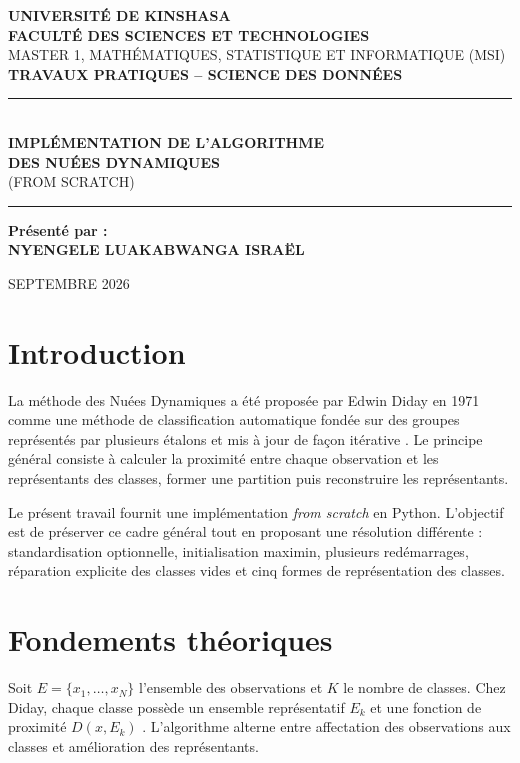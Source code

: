 \documentclass[12pt,a4paper]{article}
\begin{document}
\begin{titlepage}
\centering
{\large\textbf{UNIVERSITÉ DE KINSHASA}}\\[0.3cm]
{\large\textbf{FACULTÉ DES SCIENCES ET TECHNOLOGIES}}\\[0.3cm]
{\normalsize MASTER 1, MATHÉMATIQUES, STATISTIQUE ET INFORMATIQUE (MSI)}\\[2cm]
{\Large\textbf{TRAVAUX PRATIQUES -- SCIENCE DES DONNÉES}}\\[1.5cm]
\rule{\textwidth}{0.5pt}\\[0.5cm]
{\Huge\bfseries IMPLÉMENTATION DE L'ALGORITHME\\[0.3cm] DES NUÉES DYNAMIQUES}\\[0.3cm]
{\large (FROM SCRATCH)}\\[0.5cm]
\rule{\textwidth}{0.5pt}
\vfill
\begin{flushleft}
\large\textbf{Présenté par :}\\[0.3cm]
\textbf{NYENGELE LUAKABWANGA ISRAËL}
\end{flushleft}
\vfill
{\large SEPTEMBRE 2026}
\end{titlepage}

\tableofcontents
\newpage

\section{Introduction}
La méthode des Nuées Dynamiques a été proposée par Edwin Diday en 1971 comme une méthode de classification automatique fondée sur des groupes représentés par plusieurs étalons et mis à jour de façon itérative \cite{diday1971}. Le principe général consiste à calculer la proximité entre chaque observation et les représentants des classes, former une partition puis reconstruire les représentants.

Le présent travail fournit une implémentation \emph{from scratch} en Python. L'objectif est de préserver ce cadre général tout en proposant une résolution différente : standardisation optionnelle, initialisation maximin, plusieurs redémarrages, réparation explicite des classes vides et cinq formes de représentation des classes.

\section{Fondements théoriques}
Soit $E=\{x_1,\ldots,x_N\}$ l'ensemble des observations et $K$ le nombre de classes. Chez Diday, chaque classe possède un ensemble représentatif $E_k$ et une fonction de proximité $D(x,E_k)$ \cite{diday1971}. L'algorithme alterne entre affectation des observations aux classes et amélioration des représentants.
\end{document}
